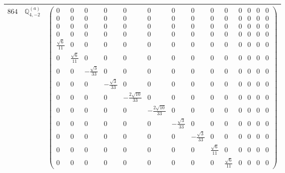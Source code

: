 \documentclass[fleqn,8pt,landscape]{jsarticle}
\begin{document}
\begin{center}
\begin{longtable}{ccc}
$ 864 $ & $ \mathbb{Q}_{4,-2}^{(a)} $ & $ \begin{pmatrix} 0 & 0 & 0 & 0 & 0 & 0 & 0 & 0 & 0 & 0 & 0 & 0 & 0 & 0 \\ 0 & 0 & 0 & 0 & 0 & 0 & 0 & 0 & 0 & 0 & 0 & 0 & 0 & 0 \\ 0 & 0 & 0 & 0 & 0 & 0 & 0 & 0 & 0 & 0 & 0 & 0 & 0 & 0 \\ 0 & 0 & 0 & 0 & 0 & 0 & 0 & 0 & 0 & 0 & 0 & 0 & 0 & 0 \\ \frac{\sqrt{6}}{11} & 0 & 0 & 0 & 0 & 0 & 0 & 0 & 0 & 0 & 0 & 0 & 0 & 0 \\ 0 & \frac{\sqrt{6}}{11} & 0 & 0 & 0 & 0 & 0 & 0 & 0 & 0 & 0 & 0 & 0 & 0 \\ 0 & 0 & - \frac{\sqrt{3}}{33} & 0 & 0 & 0 & 0 & 0 & 0 & 0 & 0 & 0 & 0 & 0 \\ 0 & 0 & 0 & - \frac{\sqrt{3}}{33} & 0 & 0 & 0 & 0 & 0 & 0 & 0 & 0 & 0 & 0 \\ 0 & 0 & 0 & 0 & - \frac{2 \sqrt{10}}{33} & 0 & 0 & 0 & 0 & 0 & 0 & 0 & 0 & 0 \\ 0 & 0 & 0 & 0 & 0 & - \frac{2 \sqrt{10}}{33} & 0 & 0 & 0 & 0 & 0 & 0 & 0 & 0 \\ 0 & 0 & 0 & 0 & 0 & 0 & - \frac{\sqrt{3}}{33} & 0 & 0 & 0 & 0 & 0 & 0 & 0 \\ 0 & 0 & 0 & 0 & 0 & 0 & 0 & - \frac{\sqrt{3}}{33} & 0 & 0 & 0 & 0 & 0 & 0 \\ 0 & 0 & 0 & 0 & 0 & 0 & 0 & 0 & \frac{\sqrt{6}}{11} & 0 & 0 & 0 & 0 & 0 \\ 0 & 0 & 0 & 0 & 0 & 0 & 0 & 0 & 0 & \frac{\sqrt{6}}{11} & 0 & 0 & 0 & 0 \end{pmatrix} $ \\ \hline

\end{longtable}
\end{center}
\end{document}
